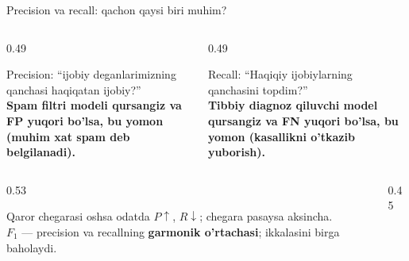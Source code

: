 \documentclass[aspectratio=169,11pt]{beamer}
\begin{document}
\begin{frame}{Precision va recall: qachon qaysi biri muhim?}
  \begin{columns}[T]
    \begin{column}{0.49\textwidth}
      \begin{tcolorbox}[defbox,title={Precision $P=TP/(TP{+}FP)$}]
        \small
        Precision: ``ijobiy deganlarimizning qanchasi haqiqatan ijobiy?''\\[4pt]
        \textbf{Spam filtri modeli qursangiz va  FP yuqori bo'lsa, bu yomon (muhim xat spam
        deb belgilanadi).}
      \end{tcolorbox}
    \end{column}
    \begin{column}{0.49\textwidth}
      \begin{tcolorbox}[defbox,title={Recall $R=TP/(TP{+}FN)$}]
        \small
        Recall: ``Haqiqiy ijobiylarning qanchasini topdim?''\\[4pt]
        \textbf{Tibbiy diagnoz qiluvchi model qursangiz va FN yuqori bo'lsa, bu yomon (kasallikni
        o'tkazib yuborish).}
      \end{tcolorbox}
    \end{column}
  \end{columns}
  \vspace{5pt}
  \begin{columns}[T]
    \begin{column}{0.53\textwidth}
      \begin{tcolorbox}[warnbox,title=Savdoning ikki tomoni]
        \footnotesize
        Qaror chegarasi oshsa odatda $P\!\uparrow$, $R\!\downarrow$; chegara pasaysa aksincha.\\[2pt]
        $F_1$ --- precision va recallning \textbf{garmonik o'rtachasi}; ikkalasini birga baholaydi.
      \end{tcolorbox}
    \end{column}
    \begin{column}{0.45\textwidth}
      \centering
    \end{column}
  \end{columns}
\end{frame}
\end{document}
